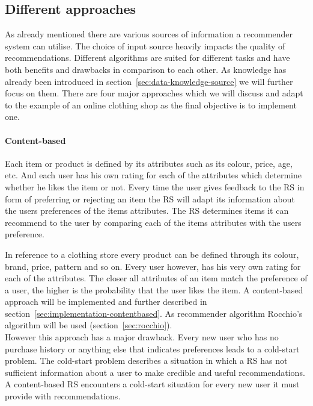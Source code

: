 \subsection{Different approaches}
\label{sec:recommenderapproaches}
As already mentioned there are various sources of information a recommender system can utilise.
The choice of input source heavily impacts the quality of recommendations.
Different algorithms are suited for different tasks and have both benefits and drawbacks in comparison to each other.\citep[p.~377-378]{burke:2007}
As knowledge has already been introduced in section~\ref{sec:data-knowledge-source} we will further focus on them.
There are four major approaches \citep[p.~378]{burke:2007} which we will discuss and adapt to the example of an online clothing shop as the final objective is to implement one.

\paragraph{Content-based}
Each item or product is defined by its attributes such as its colour, price, age, etc.
And each user has his own rating for each of the attributes which determine whether he likes the item or not.
Every time the user gives feedback to the RS in form of preferring or rejecting an item the RS will adapt its information about the users preferences of the items attributes.
The RS determines items it can recommend to the user by comparing each of the items attributes with the users preference.
\citep[p.~75]{lops:2011}

In reference to a clothing store every product can be defined through its colour, brand, price, pattern and so on.
Every user however, has his very own rating for each of the attributes.
The closer all attributes of an item match the preference of a user, the higher is the probability that the user likes the item.
A content-based approach will be implemented and further described in section~\ref{sec:implementation-contentbased}.
As recommender algorithm Rocchio's algorithm will be used (section~\ref{sec:rocchio}).
\\
However this approach has a major drawback.
Every new user who has no purchase history or anything else that indicates preferences leads to a  cold-start problem.
The cold-start problem describes a situation in which a RS has not sufficient information about a user to make credible and useful recommendations.
A content-based RS encounters a cold-start situation for every new user it must provide with recommendations.
\citep[p.~378-379]{burke:2007}

